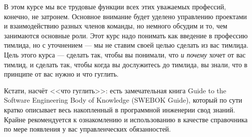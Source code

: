 \documentclass{../../text-style}
\begin{document}
В этом курсе мы все трудовые функции всех этих уважаемых профессий, конечно, не затронем. Основное внимание будет уделено управлению проектами и взаимодействию разных членов команды, но немного обсудим и то, чем занимаются основные роли. Этот курс надо понимать как введение в профессию тимлида, но с уточнением --- мы не ставим своей целью сделать из вас тимлида. Цель этого курса --- сделать так, чтобы вы понимали, что \emph{и почему} хочет от вас тимлид, и сделать так, чтобы когда вы дослужитесь до тимлида, вы знали, что в принципе от вас нужно и что гуглить.

Кстати, насчёт <<что гуглить>>: есть замечательная книга Guide to the Software Engineering Body of Knowledge (SWEBOK Guide), который по сути кратко описывает весь накопленный в программной инженерии свод знаний. Крайне рекомендуется к ознакомлению и использованию в качестве справочника по мере появления у вас управленческих обязанностей.
\end{document}
